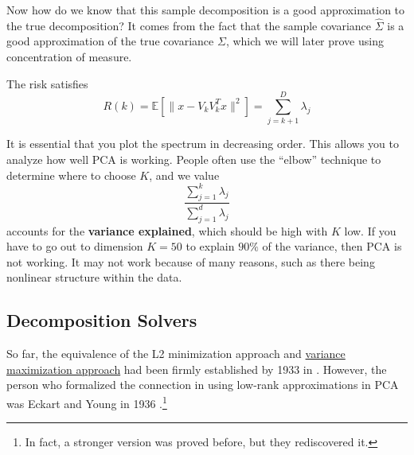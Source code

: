   Now how do we know that this sample decomposition is a good approximation to the true decomposition? It comes from the fact that the sample covariance $\hat{\Sigma}$ is a good approximation of the true covariance $\Sigma$, which we will later prove using concentration of measure. 

  \begin{theorem}[Risk]
    \label{thm:risk}
    The risk satisfies 
    \begin{equation}
      R(k) = \mathbb{E}[\| x - V_k V_k^T x \|^2 ] = \sum_{j=k+1}^D \lambda_j 
    \end{equation}
  \end{theorem}

  It is essential that you plot the spectrum in decreasing order. This allows you to analyze how well PCA is working. People often use the ``elbow'' technique to determine where to choose $K$, and we value 
  \begin{equation}
    \frac{\sum_{j=1}^k \lambda_j}{\sum_{j=1}^d \lambda_j} 
  \end{equation}
  accounts for the \textbf{variance explained}, which should be high with $K$ low. If you have to go out to dimension $K=50$ to explain $90\%$ of the variance, then PCA is not working. It may not work because of many reasons, such as there being nonlinear structure within the data. 

\subsection{Decomposition Solvers}

  So far, the equivalence of the L2 minimization approach and \hyperref[thm:variance-maximization-approach]{variance maximization approach} had been firmly established by 1933 in \cite{1933hotelling}. However, the person who formalized the connection in using low-rank approximations in PCA was Eckart and Young in 1936 \cite{1936eckart}.\footnote{In fact, a stronger version was proved before, but they rediscovered it.}
  

